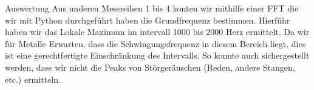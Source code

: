\documentclass[twoside]{protokoll}
\begin{document}
\begin{aufgabe}{Auswertung}
Aus underen Messreihen 1 bis 4 konten wir mithilfe einer FFT die wir mit Python durchgeführt haben die Grundfrequenz bestimmen. Hierführ haben wir das Lokale Maximum im intervall 1000 bis 2000 Herz ermittelt. Da wir für Metalle Erwarten, dass die Schwingungsfrequenz in diesem Bereich liegt, dies ist eine gerechtfertigte Einschränkung des Intervalls. So konnte auch sichergestellt werden, dass wir nicht die Peaks von Störgeräuschen (Reden, andere Stangen, etc.) ermitteln.



\end{aufgabe}
 
\end{document}
